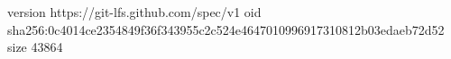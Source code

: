 version https://git-lfs.github.com/spec/v1
oid sha256:0c4014ce2354849f36f343955c2c524e4647010996917310812b03edaeb72d52
size 43864
